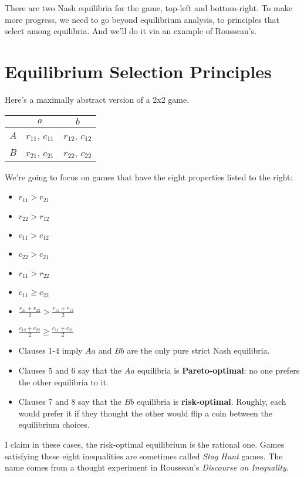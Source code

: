There are two Nash equilibria for the game, top-left and bottom-right. To make more progress, we need to go beyond equilibrium analysis, to principles that select among equilibria. And we'll do it via an example of Rousseau's.

\section*{Equilibrium Selection Principles}
\label{equilibriumselectionprinciples}
\begin{multicols}{2}
\noindent Here's a maximally abstract version of a 2x2 game.

\begin{center}
\begin{tabular}{r | c c}
& $a$ & $b$  \\\hline
$A$ & $r_{11}$, $c_{11}$ & $r_{12}$, $c_{12}$ \\
$B$ & $r_{21}$, $c_{21}$ & $r_{22}$, $c_{22}$
\end{tabular}
\end{center}
We're going to focus on games that have the eight properties listed to the right:
\columnbreak

\begin{itemize}
\item $r_{11} > r_{21}$

\item $r_{22} > r_{12}$

\item $c_{11} > c_{12}$

\item $c_{22} > c_{21}$

\item $r_{11} > r_{22}$

\item $c_{11} \geq c_{22}$

\item $\frac{r_{21}+r_{22}}{2} > \frac{r_{11}+r_{12}}{2}$

\item $\frac{c_{12}+c_{22}}{2} \geq \frac{c_{11}+c_{21}}{2}$

\end{itemize}
\end{multicols}
\begin{itemize}
\item Clauses 1-4 imply $Aa$ and $Bb$ are the only pure strict Nash equilibria.
\item Clauses 5 and 6  say that the $Aa$ equilibria is \textbf{Pareto-optimal}: no one prefers the other equilibria to it. 
\item Clauses 7 and 8 say that the $Bb$ equilibria is \textbf{risk-optimal}. Roughly, each would prefer it if they thought the other would flip a coin between the equilibrium choices.
\end{itemize}
I claim in these cases, the risk-optimal equilibrium is the rational one. Games satisfying these eight inequalities are sometimes called \emph{Stag Hunt} games. The name comes from a thought experiment in Rousseau's \emph{Discourse on Inequality}. 

